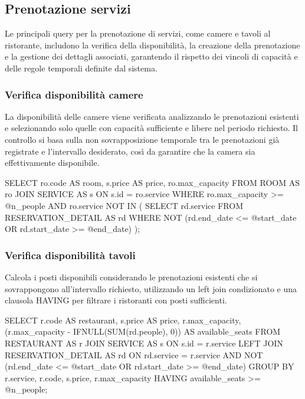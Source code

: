 \documentclass[a4paper,12pt]{report}
\begin{document}
\newpage
\subsection{Prenotazione servizi}
Le principali query per la prenotazione di servizi, come camere e
tavoli al ristorante, includono la verifica della disponibilità, la
creazione della prenotazione e la gestione dei dettagli associati,
garantendo il rispetto dei vincoli di capacità e delle regole
temporali definite dal sistema.

\subsubsection{Verifica disponibilità camere}
La disponibilità delle camere viene verificata analizzando le
prenotazioni esistenti e selezionando solo quelle con capacità
sufficiente e libere nel periodo richiesto. Il controllo si basa
sulla non sovrapposizione temporale tra le prenotazioni già
registrate e l'intervallo desiderato, così da garantire che la camera
sia effettivamente disponibile.

\begin{sqlcode}[caption={}]
SELECT
  ro.code AS room,
  s.price AS price,
  ro.max_capacity
FROM ROOM AS ro
JOIN SERVICE AS s
  ON s.id = ro.service
WHERE
  ro.max_capacity >= @n_people
  AND ro.service NOT IN (
    SELECT rd.service
    FROM RESERVATION_DETAIL AS rd
    WHERE NOT (rd.end_date <= @start_date OR rd.start_date >= @end_date)
  );
\end{sqlcode}

\subsubsection{Verifica disponibilità tavoli}
Calcola i posti disponibili considerando le prenotazioni esistenti
che si sovrappongono all'intervallo richiesto, utilizzando un left
join condizionato e una clausola HAVING per filtrare i ristoranti con
posti sufficienti.

\begin{sqlcode}[caption={}]
SELECT
  r.code AS restaurant,
  s.price AS price,
  r.max_capacity,
  (r.max_capacity - IFNULL(SUM(rd.people), 0)) AS available_seats
FROM RESTAURANT AS r
JOIN SERVICE AS s ON s.id = r.service
LEFT JOIN RESERVATION_DETAIL AS rd ON rd.service = r.service
  AND NOT (rd.end_date <= @start_date OR rd.start_date >= @end_date)
GROUP BY r.service, r.code, s.price, r.max_capacity
HAVING available_seats >= @n_people;
\end{sqlcode}
\end{document}
